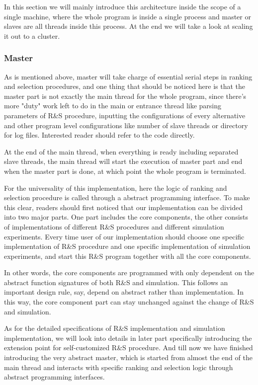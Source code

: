 \documentclass[12pt,a4paper]{report}
\begin{document}
In this section we will mainly introduce this architecture inside the scope of a single machine, where the whole program is inside a single process and master or slaves are all threads inside this process. At the end we will take a look at scaling it out to a cluster.

\subsubsection{Master}

As is mentioned above, master will take charge of essential serial steps in ranking and selection procedures, and one thing that should be noticed here is that the master part is not exactly the main thread for the whole program, since there's more "duty" work left to do in the main or entrance thread like parsing parameters of R\&S procedure, inputting the configurations of every alternative and other program level configurations like number of slave threads or directory for log files. Interested reader should refer to the code directly.

At the end of the main thread, when everything is ready including separated slave threads, the main thread will start the execution of master part and end when the master part is done, at which point the whole program is terminated.

For the universality of this implementation, here the logic of ranking and selection procedure is called through a abstract programming interface. To make this clear, readers should first noticed that our implementation can be divided into two major parts. One part includes the core components, the other consists of implementations of different R\&S procedures and different simulation experiments. Every time user of our implementation should choose one specific implementation of R\&S procedure and one specific implementation of simulation experiments, and start this R\&S program together with all the core components.

In other words, the core components are programmed with only dependent on the abstract function signatures of both R\&S and simulation. This follows an important design rule, say, depend on abstract rather than implementation. In this way, the core component part can stay unchanged against the change of R\&S and simulation.

As for the detailed specifications of R\&S implementation and simulation implementation, we will look into details in later part specifically introducing the extension point for self-customized R\&S procedure. And till now we have finished introducing the very abstract master, which is started from almost the end of the main thread and interacts with specific ranking and selection logic through abstract programming interfaces.
\end{document}

